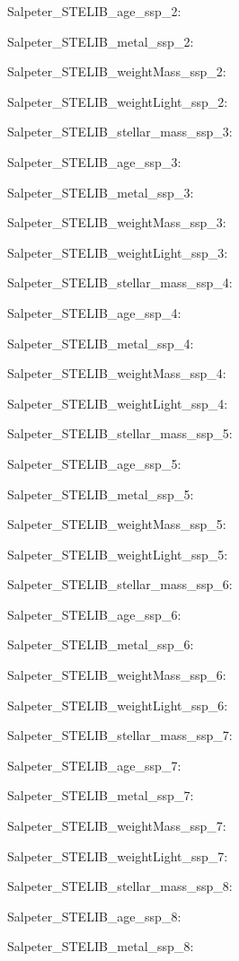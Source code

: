 \item Salpeter\_STELIB\_age\_ssp\_2: 
\item Salpeter\_STELIB\_metal\_ssp\_2: 
\item Salpeter\_STELIB\_weightMass\_ssp\_2: 
\item Salpeter\_STELIB\_weightLight\_ssp\_2: 
\item Salpeter\_STELIB\_stellar\_mass\_ssp\_3: 
\item Salpeter\_STELIB\_age\_ssp\_3: 
\item Salpeter\_STELIB\_metal\_ssp\_3: 
\item Salpeter\_STELIB\_weightMass\_ssp\_3: 
\item Salpeter\_STELIB\_weightLight\_ssp\_3: 
\item Salpeter\_STELIB\_stellar\_mass\_ssp\_4: 
\item Salpeter\_STELIB\_age\_ssp\_4: 
\item Salpeter\_STELIB\_metal\_ssp\_4: 
\item Salpeter\_STELIB\_weightMass\_ssp\_4: 
\item Salpeter\_STELIB\_weightLight\_ssp\_4: 
\item Salpeter\_STELIB\_stellar\_mass\_ssp\_5: 
\item Salpeter\_STELIB\_age\_ssp\_5: 
\item Salpeter\_STELIB\_metal\_ssp\_5: 
\item Salpeter\_STELIB\_weightMass\_ssp\_5: 
\item Salpeter\_STELIB\_weightLight\_ssp\_5: 
\item Salpeter\_STELIB\_stellar\_mass\_ssp\_6: 
\item Salpeter\_STELIB\_age\_ssp\_6: 
\item Salpeter\_STELIB\_metal\_ssp\_6: 
\item Salpeter\_STELIB\_weightMass\_ssp\_6: 
\item Salpeter\_STELIB\_weightLight\_ssp\_6: 
\item Salpeter\_STELIB\_stellar\_mass\_ssp\_7: 
\item Salpeter\_STELIB\_age\_ssp\_7: 
\item Salpeter\_STELIB\_metal\_ssp\_7: 
\item Salpeter\_STELIB\_weightMass\_ssp\_7: 
\item Salpeter\_STELIB\_weightLight\_ssp\_7: 
\item Salpeter\_STELIB\_stellar\_mass\_ssp\_8: 
\item Salpeter\_STELIB\_age\_ssp\_8: 
\item Salpeter\_STELIB\_metal\_ssp\_8: 

